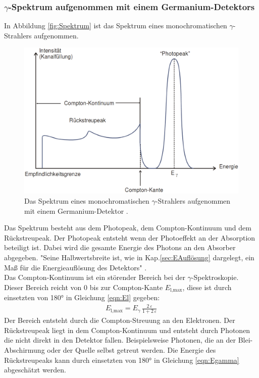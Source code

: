 \subsubsection{\texorpdfstring{$\gamma$}{}-Spektrum aufgenommen mit einem Germanium-Detektors}
In Abbildung \eqref{fig:Spektrum} ist das Spektrum eines monochromatischen $\gamma$-Strahlers aufgenommen.

\begin{figure} %
	\centering
	\includegraphics[width=0.8\linewidth]{Bilder/Spektrum.png}
	\caption{Das Spektrum eines monochromatischen $\gamma$-Strahlers aufgenommen mit einem Germanium-Detektor \cite{V18}.}
	\label{fig:Spektrum}
\end{figure}

Das Spektrum besteht aus dem Photopeak, dem Compton-Kontinuum und dem Rückstreupeak. Der Photopeak entsteht wenn der Photoeffekt an der Absorption beteiligt ist. Dabei wird die gesamte Energie des Photons an den Absorber abgegeben. "Seine Halbwertsbreite ist, wie in Kap.\ref{sec:EAuflösung} dargelegt, ein Maß für die Energieauflösung des Detektors" \cite[22]{V18}. \\
Das Compton-Kontinuum ist ein störender Bereich bei der $\gamma$-Spektroskopie. Dieser Bereich reicht von 0 bis zur Compton-Kante $E_\text{l,max}$, diese ist durch einsetzten von 180° in Gleichung \eqref{eqn:El} gegeben:
\begin{align}
	E_\text{l,max}= E_\gamma \, \frac{2\,\varepsilon} {1 + 2\,\varepsilon}
	\label{eqn:Comptonkante}
\end{align}
Der Bereich entsteht durch die Compton-Streuung an den Elektronen. Der Rückstreupeak liegt in dem Compton-Kontinuum und entsteht durch Photonen die nicht direkt in den Detektor fallen. Beispielsweise Photonen, die an der Blei-Abschirmung oder der Quelle selbst getreut werden. Die Energie des Rückstreupeaks kann durch einsetzten von 180° in Gleichung \eqref{eqn:Egamma} abgeschätzt werden.



